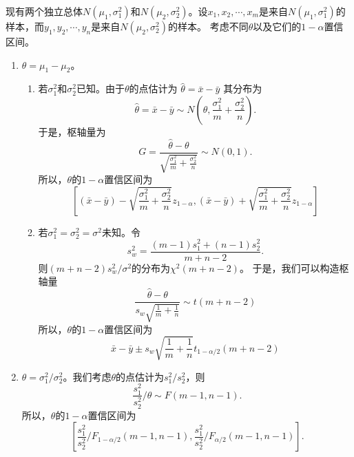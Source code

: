 \begin{example}
现有两个独立总体$N(\mu_1,\sigma_1^2)$和$N(\mu_2,\sigma_2^2)$。设$x_1,x_2,\cdots,x_m$是来自$N(\mu_1,\sigma_1^2)$的样本，而$y_1,y_2,\cdots,y_n$是来自$N(\mu_2,\sigma_2^2)$的样本。
考虑不同$\theta$以及它们的$1-\alpha$置信区间。
\begin{enumerate}
    \item $\theta = \mu_1 - \mu_2$。
    \begin{enumerate}
        \item 若$\sigma_1^2$和$\sigma_2^2$已知。由于$\theta$的点估计为
        $
        \hat{\theta} = \bar{x} - \bar{y}
        $
        其分布为
        $$
        \hat{\theta} = \bar{x} - \bar{y} \sim N\left(\theta, \frac{\sigma_1^2}{m} + \frac{\sigma_2^2}{n}\right).
        $$
        于是，枢轴量为
        $$
        G = \frac{\hat{\theta} - \theta}{ \sqrt{\frac{\sigma_1^2}{m} + \frac{\sigma_2^2}{n}}} \sim N(0,1).
        $$
        所以，$\theta$的$1-\alpha$置信区间为
        $$
        \left[
        (\bar{x}-\bar{y}) - \sqrt{\frac{\sigma_1^2}{m} + \frac{\sigma_2^2}{n}} z_{1-\alpha},
        (\bar{x}-\bar{y}) + \sqrt{\frac{\sigma_1^2}{m} + \frac{\sigma_2^2}{n}} z_{1-\alpha}
        \right]
        $$
        \item 若$\sigma_1^2= \sigma_2^2 = \sigma^2$未知。令
        $$
        s_w^2 = \frac{(m-1)s_1^2 + (n-1)s_2^2}{m+n-2}.
        $$
        则$(m+n-2)s_w^2 / \sigma^2$的分布为$\chi^2(m+n-2)$。
        于是，我们可以构造枢轴量
        $$
        \frac{\hat{\theta} -\theta }{s_w\sqrt{\frac{1}{m}+\frac{1}{n}} } \sim t(m+n-2)
        $$
        所以，$\theta$的$1-\alpha$置信区间为
        $$
        \bar{x}-\bar{y} \pm s_w\sqrt{\frac{1}{m}+\frac{1}{n}} t_{1-\alpha/2}(m+n-2)
        $$
    \end{enumerate}
    \item $\theta = \sigma_1^2/\sigma_2^2$。我们考虑$\theta$的点估计为$s_1^2/s_2^2$，则$$
    \frac{s_1^2}{s_2^2}/\theta \sim F(m-1,n-1).
    $$
    所以，$\theta$的$1-\alpha$置信区间为
    $$
    \left[
     \frac{s_1^2}{s_2^2}/ F_{1-\alpha/2}(m-1,n-1),
     \frac{s_1^2}{s_2^2}/ F_{\alpha/2}(m-1,n-1)
    \right].
    $$
\end{enumerate}
\end{example}

